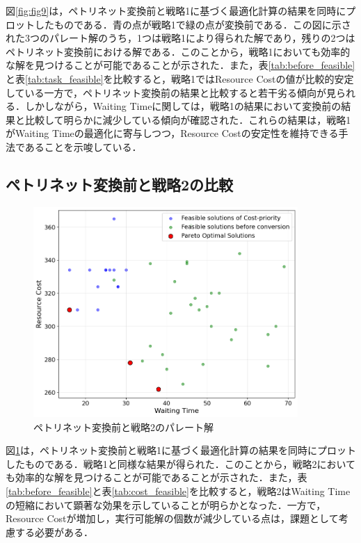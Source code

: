 図\ref{fig:fig9}は，ペトリネット変換前と戦略1に基づく最適化計算の結果を同時にプロットしたものである．青の点が戦略1で緑の点が変換前である．この図に示された3つのパレート解のうち，1つは戦略1により得られた解であり，残りの2つはペトリネット変換前における解である．このことから，戦略1においても効率的な解を見つけることが可能であることが示された．また，表\ref{tab:before_feasible}と表\ref{tab:task_feasible}を比較すると，戦略1ではResource Costの値が比較的安定している一方で，ペトリネット変換前の結果と比較すると若干劣る傾向が見られる．しかしながら，Waiting Timeに関しては，戦略1の結果において変換前の結果と比較して明らかに減少している傾向が確認された．これらの結果は，戦略1がWaiting Timeの最適化に寄与しつつ，Resource Costの安定性を維持できる手法であることを示唆している．

\subsection{ペトリネット変換前と戦略2の比較}
\begin{figure}[H]
    \centering
    \includegraphics[width=0.8\linewidth, height=8cm]{./images/cost_and_before_job5.png}
    \caption{ペトリネット変換前と戦略2のパレート解}
    \label{fig:fig10}
\end{figure}

図\ref{fig:fig10}は，ペトリネット変換前と戦略1に基づく最適化計算の結果を同時にプロットしたものである．戦略1と同様な結果が得られた．このことから，戦略2においても効率的な解を見つけることが可能であることが示された．また，表\ref{tab:before_feasible}と表\ref{tab:cost_feasible}を比較すると，戦略2はWaiting Timeの短縮において顕著な効果を示していることが明らかとなった．一方で，Resource Costが増加し，実行可能解の個数が減少している点は，課題として考慮する必要がある．

